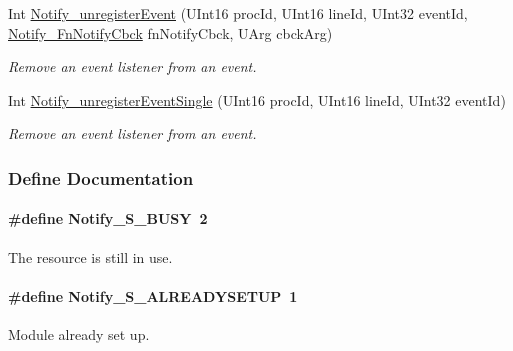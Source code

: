 \begin{DoxyCompactItemize}
Int \hyperlink{_notify_8h_a04733f534741df34fb5c0fbd7cbab8bc}{Notify\_\-unregisterEvent} (UInt16 procId, UInt16 lineId, UInt32 eventId, \hyperlink{_notify_8h_ab362f7571ee3d7f7abaa743914edcd62}{Notify\_\-FnNotifyCbck} fnNotifyCbck, UArg cbckArg)
\begin{DoxyCompactList}\small\item\em Remove an event listener from an event. \item\end{DoxyCompactList}\item 
Int \hyperlink{_notify_8h_a7d8a78106ebe364b994f828d9b90f12f}{Notify\_\-unregisterEventSingle} (UInt16 procId, UInt16 lineId, UInt32 eventId)
\begin{DoxyCompactList}\small\item\em Remove an event listener from an event. \item\end{DoxyCompactList}\end{DoxyCompactItemize}


\subsubsection{Define Documentation}
\paragraph[{Notify\_\-S\_\-BUSY}]{\setlength{\rightskip}{0pt plus 5cm}\#define Notify\_\-S\_\-BUSY~2}\hfill\label{_notify_8h_a0d58ddfdb5d08f6ca1de749701033450}


The resource is still in use. 

\paragraph[{Notify\_\-S\_\-ALREADYSETUP}]{\setlength{\rightskip}{0pt plus 5cm}\#define Notify\_\-S\_\-ALREADYSETUP~1}\hfill\label{_notify_8h_a4a3b8a694b528547f8478d0b9e24289c}


Module already set up. 

